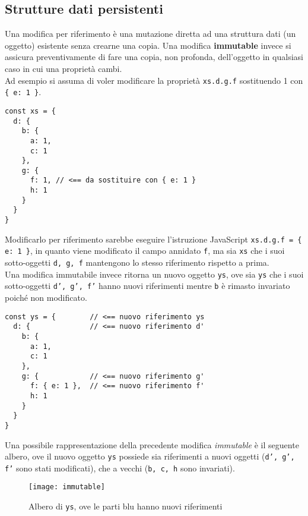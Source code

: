 \subsection{Strutture dati persistenti}

Una modifica per riferimento è una mutazione diretta ad una struttura dati (un oggetto) esistente senza crearne una copia. Una modifica \textbf{immutable} invece si assicura preventivamente di fare una copia, non profonda, dell'oggetto in qualsiasi caso in cui una proprietà cambi. \\

Ad esempio si assuma di voler modificare la proprietà \texttt{xs.d.g.f} sostituendo 1 con \texttt{\{ e: 1 \}}. 

\begin{lstlisting}[language={[Sharp]C}]
const xs = {
  d: {
    b: {
      a: 1,
      c: 1
    },
    g: {
      f: 1, // <== da sostituire con { e: 1 }
      h: 1
    }
  }
}
\end{lstlisting}

Modificarlo per riferimento sarebbe eseguire l'istruzione JavaScript \texttt{xs.d.g.f = \{ e: 1 \}}, in quanto viene modificato il campo annidato \texttt{f}, ma sia \texttt{xs} che i suoi sotto-oggetti \texttt{d, g, f} mantengono lo stesso riferimento rispetto a prima. \\

Una modifica immutabile invece ritorna un nuovo oggetto \texttt{ys}, ove sia \texttt{ys} che i suoi sotto-oggetti \texttt{d', g', f'} hanno nuovi riferimenti mentre \texttt{b} è rimasto invariato poiché non modificato.

\begin{lstlisting}[language={[Sharp]C}]
const ys = {        // <== nuovo riferimento ys
  d: {              // <== nuovo riferimento d'
    b: {
      a: 1,
      c: 1
    },
    g: {            // <== nuovo riferimento g'
      f: { e: 1 },  // <== nuovo riferimento f'
      h: 1
    }
  }
}
\end{lstlisting}

Una possibile rappresentazione della precedente modifica \textit{immutable} è il seguente albero, ove il nuovo oggetto \texttt{ys} possiede sia riferimenti a nuovi oggetti (\texttt{d', g', f'} sono stati modificati), che a vecchi (\texttt{b, c, h} sono invariati).

\begin{figure}[H] 
  \centering 
  \texttt{[image: immutable]} 
  \caption{Albero di \texttt{ys}, ove le parti blu hanno nuovi riferimenti}
\end{figure}

